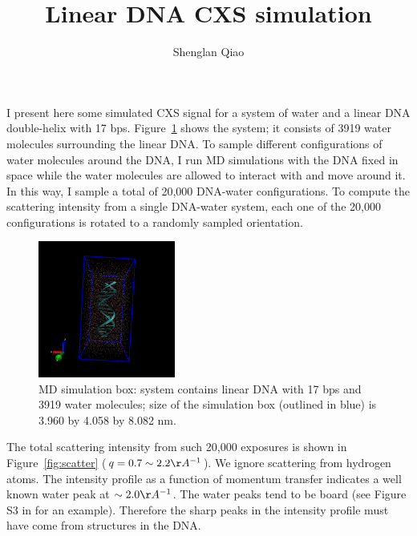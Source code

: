 \documentclass[12pt]{article}
\title{Linear DNA CXS simulation}
\author{Shenglan Qiao}
\begin{document}
\maketitle

I present here some simulated CXS signal for a system of water and a linear DNA double-helix with 17 bps. Figure~\ref{fig:dna} shows the system; it consists of  3919 water molecules surrounding the linear DNA. To sample different configurations of water molecules around the DNA, I run MD simulations with the DNA fixed in space while the water molecules are allowed to interact with and move around it. In this way, I sample a total of 20,000 DNA-water configurations. To compute the scattering intensity from a single DNA-water system, each one of the 20,000 configurations is rotated to a randomly sampled orientation. 

\begin{figure}[h!]
\center
\includegraphics[width=0.4\textwidth]{figures/dna_box.png}
\caption{MD simulation box: system contains linear DNA with 17 bps and 3919 water molecules; size of the simulation box (outlined in blue) is 3.960 by 4.058 by 8.082 nm.}
\label{fig:dna}
\end{figure}

The total scattering intensity from such 20,000 exposures is shown in Figure~\ref{fig:scatter} ($q = 0.7 \sim 2.2 \AA^{-1}$). We ignore scattering from hydrogen atoms. The intensity profile as a function of momentum transfer indicates a well known water peak at $\sim 2.0 \AA^{-1}$. The water peaks tend to be board (see Figure S3 in \cite{waterSellberg} for an example). Therefore the sharp peaks in the intensity profile must have come from structures in the DNA.
\end{document}

